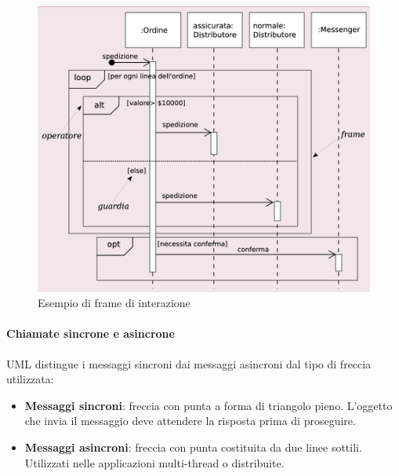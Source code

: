 \begin{figure}[H]
    \centering
    \includegraphics[width=0.75\linewidth]{assets/UML/sequence/sequence-4.png}
    \caption{Esempio di frame di interazione}
\end{figure}

\paragraph{Chiamate sincrone e asincrone}
UML distingue i messaggi sincroni dai messaggi asincroni dal tipo di freccia utilizzata:
\begin{itemize}
    \item \textbf{Messaggi sincroni}: freccia con punta a forma di triangolo pieno. L’oggetto che invia il messaggio deve attendere la risposta prima di proseguire.
    \item \textbf{Messaggi asincroni}: freccia con punta costituita da due linee sottili. Utilizzati nelle applicazioni multi-thread o distribuite.
\end{itemize}

\newpage